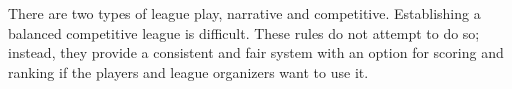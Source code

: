 There are two types of league play, narrative and competitive.
Establishing a balanced competitive league is difficult.
These rules do not attempt to do so; instead, they provide a consistent and fair system with an option for scoring and ranking if the players and league organizers want to use it.
